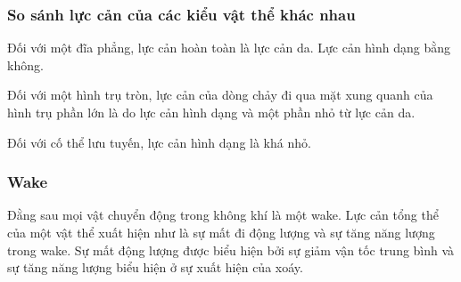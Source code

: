 \documentclass[KHI_DONG_HOC.tex]{subfiles}
\begin{document}
\subsubsection{So sánh lực cản của các kiểu vật thể khác nhau}
Đối với một đĩa phẳng, lực cản hoàn toàn là lực cản da. Lực cản hình dạng bằng không.

Đối với một hình trụ tròn, lực cản của dòng chảy đi qua mặt xung quanh của hình trụ phần lớn là do lực cản hình dạng và một phần nhỏ từ lực cản da.

Đối với cố thể lưu tuyến, lực cản hình dạng là khá nhỏ. 
\subsubsection{Wake}
Đằng sau mọi vật chuyển động trong không khí là một wake. Lực cản tổng thể của một vật thể xuất hiện như là sự mất đi động lượng và sự tăng năng lượng trong wake. Sự mất động lượng được biểu hiện bởi sự giảm vận tốc trung bình và sự tăng năng lượng biểu hiện ở sự xuất hiện của xoáy.
\end{document}
